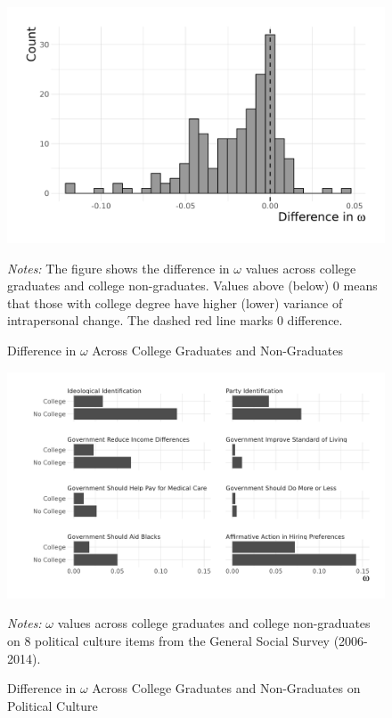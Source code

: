 \documentclass[
  12pt,
]{article}
\begin{document}
\begin{figure}[ht]
\caption{Difference in $\omega$ Across College Graduates and Non-Graduates}

\begin{center}\includegraphics[width=450px]{../figures/figure_3_bw} \end{center}

\textit{Notes:} The figure shows the difference in $\omega$ values across college graduates and college non-graduates. Values above (below) 0 means that those with college degree have higher (lower) variance of intrapersonal change. The dashed red line marks 0 difference.
\end{figure}

\newpage

\begin{figure}[ht]
\caption{Difference in $\omega$ Across College Graduates and Non-Graduates on Political Culture}

\begin{center}\includegraphics[width=450px]{../figures/figure_4_bw} \end{center}

\textit{Notes:} $\omega$ values across college graduates and college non-graduates on 8 political culture items from the General Social Survey (2006-2014).
\end{figure}
\end{document}

